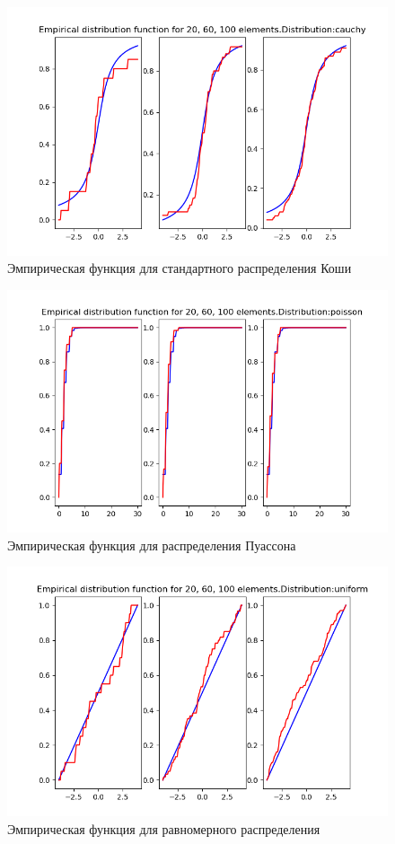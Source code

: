 \documentclass[a4]{article}
\begin{document}
\begin{center}
\begin{figure}[H]
\caption{Эмпирическая функция для стандартного распределения Коши }
\includegraphics[width=\textwidth]{e_cauchy.png} 
\end{figure}

\begin{figure}[H]
\caption{Эмпирическая функция для распределения Пуассона }
\includegraphics[width=\textwidth]{e_poisson.png} 
\end{figure}

\begin{figure}[H]
 \caption{Эмпирическая функция для равномерного распределения }
\includegraphics[width=\textwidth]{e_uniform.png}
\end{figure}
\end{center}
\end{document}

